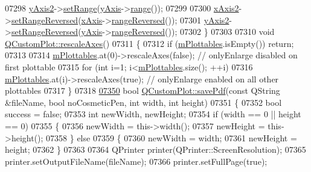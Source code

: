 \begin{DoxyCode}
07298   \hyperlink{a00116_a4fd6679232da7da0a1ae4e1b6ae83d6e}{yAxis2}->\hyperlink{a00025_a57d6ee9e9009fe88cb19db476ec70bca}{setRange}(\hyperlink{a00116_af168096ce67002b1fbce18ae5dd1b652}{yAxis}->\hyperlink{a00025_ab1ea79a4f5ea4cf42620f8f51c477ac4}{range}());
07299   
07300   \hyperlink{a00116_a058f6d3a4c86bf94c476e5c380711dba}{xAxis2}->\hyperlink{a00025_a2172fdb196b1a0dc3f40992fcad8e9e1}{setRangeReversed}(\hyperlink{a00116_a384438707adbcc96b0fa1324106f7129}{xAxis}->\hyperlink{a00025_ade26dc7994ccd8a11f64fd83377ee021}{rangeReversed}());
07301   \hyperlink{a00116_a4fd6679232da7da0a1ae4e1b6ae83d6e}{yAxis2}->\hyperlink{a00025_a2172fdb196b1a0dc3f40992fcad8e9e1}{setRangeReversed}(\hyperlink{a00116_af168096ce67002b1fbce18ae5dd1b652}{yAxis}->\hyperlink{a00025_ade26dc7994ccd8a11f64fd83377ee021}{rangeReversed}());
07302 \}
07303 
07310 \textcolor{keywordtype}{void} \hyperlink{a00116_a098c37f4447cbea48764873689ba1695}{QCustomPlot::rescaleAxes}()
07311 \{
07312   \textcolor{keywordflow}{if} (\hyperlink{a00116_a57ed6eb2e0a767a8344de45110a3e81d}{mPlottables}.isEmpty()) \textcolor{keywordflow}{return};
07313   
07314   \hyperlink{a00116_a57ed6eb2e0a767a8344de45110a3e81d}{mPlottables}.at(0)->rescaleAxes(\textcolor{keyword}{false}); \textcolor{comment}{// onlyEnlarge disabled on first plottable}
07315   \textcolor{keywordflow}{for} (\textcolor{keywordtype}{int} i=1; i<\hyperlink{a00116_a57ed6eb2e0a767a8344de45110a3e81d}{mPlottables}.size(); ++i)
07316     \hyperlink{a00116_a57ed6eb2e0a767a8344de45110a3e81d}{mPlottables}.at(i)->rescaleAxes(\textcolor{keyword}{true});  \textcolor{comment}{// onlyEnlarge enabled on all other plottables}
07317 \}
07318 
\hypertarget{a00115_source_l07350}{}\hyperlink{a00116_a84e33ad7492180f20ff520e557ed102d}{07350} \textcolor{keywordtype}{bool} \hyperlink{a00116_a84e33ad7492180f20ff520e557ed102d}{QCustomPlot::savePdf}(\textcolor{keyword}{const} QString &fileName, \textcolor{keywordtype}{bool} noCosmeticPen, \textcolor{keywordtype}{int} width, \textcolor{keywordtype}{int} 
      height)
07351 \{
07352   \textcolor{keywordtype}{bool} success = \textcolor{keyword}{false};
07353   \textcolor{keywordtype}{int} newWidth, newHeight;
07354   \textcolor{keywordflow}{if} (width == 0 || height == 0)
07355   \{
07356     newWidth = this->width();
07357     newHeight = this->height();
07358   \} \textcolor{keywordflow}{else}
07359   \{
07360     newWidth = width;
07361     newHeight = height;
07362   \}
07363   
07364   QPrinter printer(QPrinter::ScreenResolution);
07365   printer.setOutputFileName(fileName);
07366   printer.setFullPage(\textcolor{keyword}{true});

\end{DoxyCode}
